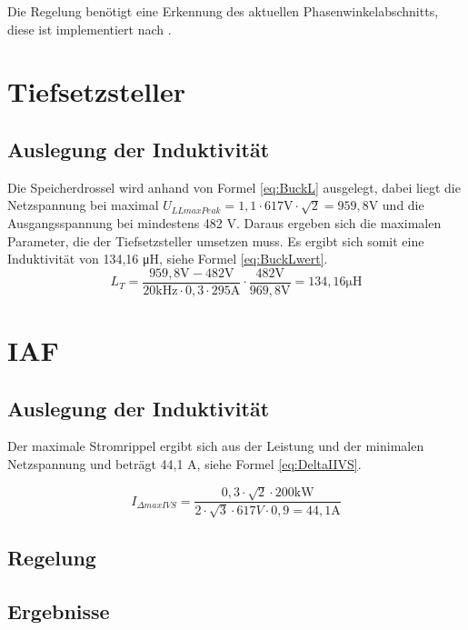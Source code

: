Die Regelung benötigt eine Erkennung des aktuellen Phasenwinkelabschnitts, diese ist implementiert nach \cite{InstituteofElectricalandElectronicsEngineers}.

\section{Tiefsetzsteller}

	\subsection{Auslegung der Induktivität}
	Die Speicherdrossel wird anhand von Formel \ref{eq:BuckL} ausgelegt, dabei liegt die Netzspannung bei maximal $ U_{LLmaxPeak}=1,1 \cdot 617 \si{\V} \cdot \sqrt{2}=959,8 \si{\V} $ und die Ausgangsspannung bei mindestens 482 \si{\V}. Daraus ergeben sich die maximalen Parameter, die der Tiefsetzsteller umsetzen muss. Es ergibt sich somit eine Induktivität von 134,16 \si{\micro \henry}, siehe Formel \ref{eq:BuckLwert}.
	 \begin{equation}
	 	\label{eq:BuckLwert}
	 	L_{T}=\dfrac{959,8\si{\V} - 482 \si{\V}}{20 \si{\kilo \hertz}\cdot 0,3 \cdot 295 \si{\ampere}}\cdot \dfrac{482 \si{\V}}{969,8 \si{\V}}= 134,16 \si{\micro \henry} 
	 \end{equation}

\section{IAF}

	\cite{IAF99}
	
	\subsection{Auslegung der Induktivität}
	Der maximale Stromrippel ergibt sich aus der Leistung und der minimalen Netzspannung und beträgt 44,1 \si{\A}, siehe Formel \ref{eq:DeltaIIVS}.
	
	\begin{equation}
		\label{eq:DeltaIIVS}
		I_{\Delta max IVS}= \dfrac{0,3\cdot \sqrt{2} \cdot 200 \si{\kilo \watt}}{2 \cdot \sqrt{3} \cdot 617 \si{V} \cdot 0,9 = 44,1 \si{\A}}
	\end{equation}
	
	\subsection{Regelung}
	
	\subsection{Ergebnisse}
	

